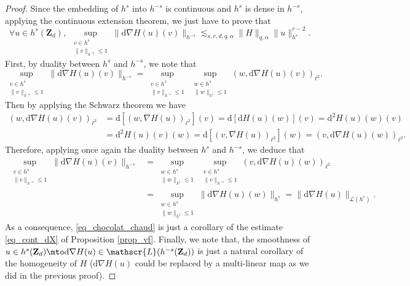 \begin{proof}
Since the embedding of $h^s$ into $h^{-s}$ is continuous and $h^s$ is dense in $h^{-s}$, applying the continuous extension theorem, we just have to prove that
\begin{equation}
\label{eq_chocolat_chaud}
\forall u \in h^s(\mathbf{Z}_d), \ \sup_{\substack{v\in h^s \\ \| v\|_{h^{-s}}\leq 1}} \| \mathrm{d}\nabla H(u)(v) \|_{h^{-s}} \lesssim_{s,r,d,q,\alpha} \| H \|_{q,\alpha} \|u\|_{h^s}^{r-2}.
\end{equation}
First, by duality between $h^s$ and $h^{-s}$, we note that
\[
\sup_{\substack{v\in h^s \\ \| v\|_{h^{-s}}\leq 1}} \| \mathrm{d}\nabla H(u)(v) \|_{h^{-s}} = \sup_{\substack{v\in h^s \\ \| v\|_{h^{-s}}\leq 1}} \sup_{\substack{w\in h^s \\ \| w\|_{h^{s}}\leq 1}} (w, \mathrm{d} \nabla H(u)(v))_{\ell^2}.
\]
Then by applying the Schwarz theorem we have
\begin{align*}
(w, \mathrm{d} \nabla H(u)(v))_{\ell^2} &= \mathrm{d}[(w,\nabla H(u))_{\ell^2}](v) = \mathrm{d}[\mathrm{d} H(u)(w)](v) = \mathrm{d}^2 H(u)(w)(v) \\
&= \mathrm{d}^2 H(u)(v)(w) = \mathrm{d}[(v, \nabla H(u))_{\ell^2}](w) = (v, \mathrm{d} \nabla H(u)(w))_{\ell^2}.
\end{align*}
Therefore, applying once again the duality between $h^s$ and $h^{-s}$, we deduce that
\begin{equation*}
\begin{split}
\sup_{\substack{v\in h^s \\ \| v\|_{h^{-s}}\leq 1}} \| \mathrm{d} \nabla H(u)(v) \|_{h^{-s}} &= \! \! \sup_{\substack{w\in h^s \\ \| w\|_{h^{s}}\leq 1}} \sup_{\substack{v\in h^s \\ \| v\|_{h^{-s}}\leq 1}} (v, \mathrm{d} \nabla H(u)(w))_{\ell^2} \\ &= \! \! \sup_{\substack{w\in h^s \\ \| w\|_{h^{s}}\leq 1}} \| \mathrm{d} \nabla H(u)(w) \|_{h^{s}}
= \|\mathrm{d} \nabla H(u)\|_{\mathscr{L}(h^s)}.
\end{split}
\end{equation*}
As a consequence, \eqref{eq_chocolat_chaud} is just a corollary of the estimate \eqref{eq_cont_dX} of Proposition \ref{prop_vf}. Finally, we note that, the smoothness of $u\in h^s(\mathbf{Z}_d) \mto \mathrm{d}\nabla H(u) \in \mathscr{L}(h^{-s}(\mathbf{Z}_d))$ is just a natural corollary of the homogeneity of $H$ (\ie $\mathrm{d}\nabla H(u)$ could be replaced by a multi-linear map as we did in the previous proof).
\end{proof}

